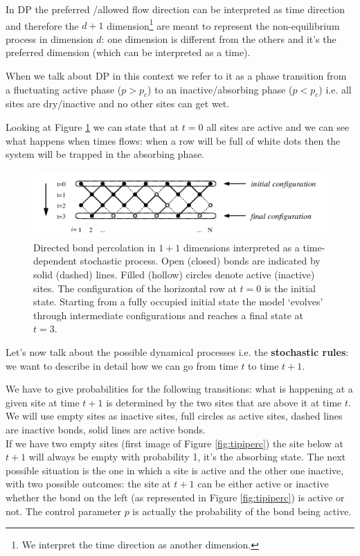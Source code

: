 \documentclass[\main/main.tex]{subfiles}
\begin{document}
In DP the preferred /allowed flow direction can be interpreted as time direction and therefore the $d+1$ dimension\footnote{We interpret the time direction as another dimension.} are meant to represent the non-equilibrium process in dimension $d$: one dimension is different from the others and it's the preferred dimension (which can be interpreted as a time).

When we talk about DP in this context we refer to it as a phase transition from a fluctuating active phase ($p>p_c$) to an inactive/absorbing phase ($p<p_c $) i.e. all sites are dry/inactive and no other sites can get wet.

Looking at Figure \ref{fig:non} we can state that at $t=0$ all sites are active and we can see what happens when times flows: when a row will be full of white dots then the system will be trapped in the absorbing phase.

\begin{figure}[ht]
    \centering
    \includegraphics[width=\linewidth]{Lectures/Images/dirtime.jpg}
    \caption{Directed bond percolation in $1+1$ dimensions interpreted as a time-dependent stochastic process.
    Open (closed) bonds are indicated by solid (dashed) lines. Filled (hollow) circles denote active (inactive) sites. The configuration of the horizontal row at $t = 0$ is the initial state. Starting from a fully occupied initial state the model ‘evolves’ through intermediate configurations and reaches a final state at $t = 3$.
}
    \label{fig:non}
\end{figure}

Let's now talk about the possible dynamical processes i.e. the \textbf{stochastic rules}: we want to describe in detail how we can go from time $t$ to time $t+1$.

We have to give probabilities for the following transitions: what is happening at a given site at time $t+1$ is determined by the two sites that are above it at time $t$. We will use empty sites as inactive sites, full circles as active sites, dashed lines are inactive bonds, solid lines are active bonds. \\

If we have two empty sites (first image of Figure \ref{fig:tipiperc}) the site below at $t+1$ will always be empty with probability 1, it's the absorbing state. The next possible situation is the one in which a site is active and the other one inactive, with two possible outcomes: the site at $t+1$ can be either active or inactive whether the bond on the left (as represented in Figure \ref{fig:tipiperc}) is active or not. The control parameter $p$ is actually the probability of the bond being active.
\end{document}
